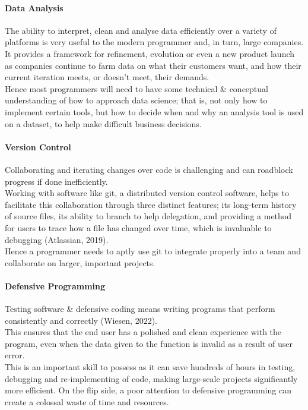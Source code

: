 \documentclass[a4paper, 11pt]{report}
\begin{document}
	\paragraph{Data Analysis} The ability to interpret, clean and analyse data efficiently over a variety of platforms is very useful to the modern programmer and, in turn, large companies.
	\\It provides a framework for refinement, evolution or even a new product launch as companies continue to farm data on what their customers want, and how their current iteration meets, or doesn't meet, their demands.
	\\Hence most programmers will need to have some technical \& conceptual understanding of how to approach data science; that is, not only how to implement certain tools, but how to decide when and why an analysis tool is used on a dataset, to help make difficult business decisions.

	\paragraph{Version Control} Collaborating and iterating changes over code is challenging and can roadblock progress if done inefficiently.
	\\Working with software like git, a distributed version control software, helps to facilitate this collaboration through three distinct features; its long-term history of source files, its ability to branch to help delegation, and providing a method for users to trace how a file has changed over time, which is invaluable to debugging (Atlassian, 2019).
	\\Hence a programmer needs to aptly use git to integrate properly into a team and collaborate on larger, important projects.

	\paragraph{Defensive Programming} Testing software \& defensive coding means writing programs that perform consistently and correctly (Wiesen, 2022).
	\\This ensures that the end user has a polished and clean experience with the program, even when the data given to the function is invalid as a result of user error.
	\\This is an important skill to possess as it can save hundreds of hours in testing, debugging and re-implementing of code, making large-scale projects significantly more efficient. On the flip side, a poor attention to defensive programming can create a colossal waste of time and resources.
\end{document}
